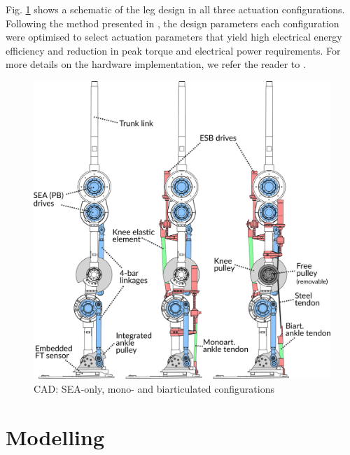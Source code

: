 \documentclass[letterpaper, 10 pt, conference]{ieeeconf}  %
\begin{document}
Fig. \ref{fig:configurations} shows a schematic of the leg design in all three actuation configurations. Following the method presented in \cite{roozing2016design}, the design parameters each configuration were optimised to select actuation parameters that yield high electrical energy efficiency and reduction in peak torque and electrical power requirements. For more details on the hardware implementation, we refer the reader to \cite{roozing_design_2018}.

\begin{figure}[ht]
	\centering
	\includegraphics[width=0.98\linewidth]{cad}
	\caption{CAD: SEA-only, mono- and biarticulated configurations}
	\label{fig:configurations}
\end{figure}


\section{Modelling} 
\label{sec:modelling}
\end{document}
